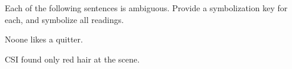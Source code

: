 %
\begin{practiceproblems}
\problempart
Each of the following sentences is ambiguous. Provide a symbolization key for each, and symbolize all readings.
\begin{earg}
	\item Noone likes a quitter.
	\item CSI found only red hair at the scene.
\end{earg}


\end{practiceproblems}
